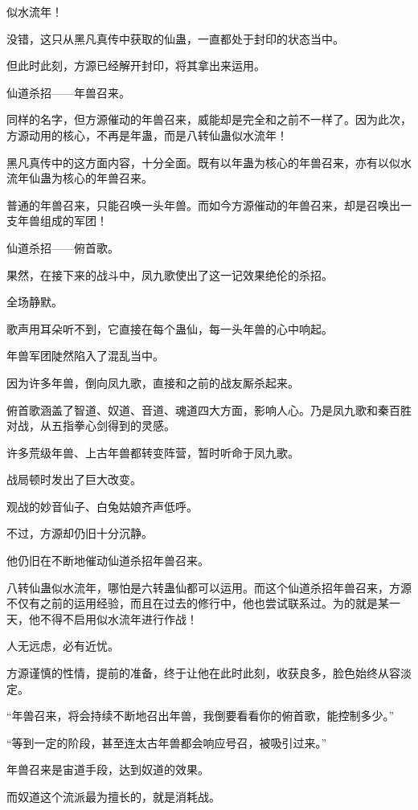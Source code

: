 \begin{this_body}
似水流年！

没错，这只从黑凡真传中获取的仙蛊，一直都处于封印的状态当中。

但此时此刻，方源已经解开封印，将其拿出来运用。

仙道杀招——年兽召来。

同样的名字，但方源催动的年兽召来，威能却是完全和之前不一样了。因为此次，方源动用的核心，不再是年蛊，而是八转仙蛊似水流年！

黑凡真传中的这方面内容，十分全面。既有以年蛊为核心的年兽召来，亦有以似水流年仙蛊为核心的年兽召来。

普通的年兽召来，只能召唤一头年兽。而如今方源催动的年兽召来，却是召唤出一支年兽组成的军团！

仙道杀招——俯首歌。

果然，在接下来的战斗中，凤九歌使出了这一记效果绝伦的杀招。

全场静默。

歌声用耳朵听不到，它直接在每个蛊仙，每一头年兽的心中响起。

年兽军团陡然陷入了混乱当中。

因为许多年兽，倒向凤九歌，直接和之前的战友厮杀起来。

俯首歌涵盖了智道、奴道、音道、魂道四大方面，影响人心。乃是凤九歌和秦百胜对战，从五指拳心剑得到的灵感。

许多荒级年兽、上古年兽都转变阵营，暂时听命于凤九歌。

战局顿时发出了巨大改变。

观战的妙音仙子、白兔姑娘齐声低呼。

不过，方源却仍旧十分沉静。

他仍旧在不断地催动仙道杀招年兽召来。

八转仙蛊似水流年，哪怕是六转蛊仙都可以运用。而这个仙道杀招年兽召来，方源不仅有之前的运用经验，而且在过去的修行中，他也尝试联系过。为的就是某一天，他不得不启用似水流年进行作战！

人无远虑，必有近忧。

方源谨慎的性情，提前的准备，终于让他在此时此刻，收获良多，脸色始终从容淡定。

“年兽召来，将会持续不断地召出年兽，我倒要看看你的俯首歌，能控制多少。”

“等到一定的阶段，甚至连太古年兽都会响应号召，被吸引过来。”

年兽召来是宙道手段，达到奴道的效果。

而奴道这个流派最为擅长的，就是消耗战。


\end{this_body}
